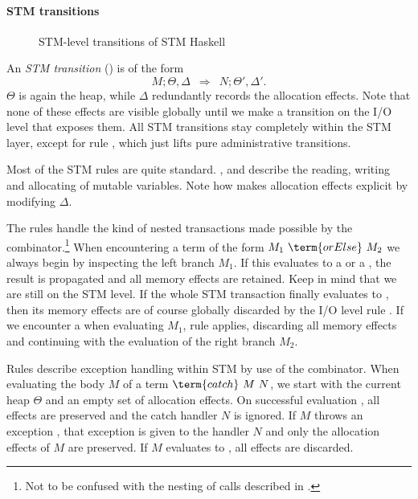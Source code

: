 \paragraph{STM transitions}

\begin{figure}

\caption{STM-level transitions of STM Haskell \parencite{harris-et-al-2005}}
\label{fig:orig-stm}
\end{figure}

An \emph{STM transition} () is of the form 
$$M;\Theta,\Delta \enspace\Rightarrow\enspace N;\Theta',\Delta'.$$
$\Theta$ is again the heap, while $\Delta$ redundantly records the allocation effects.
Note that none of these effects are visible globally until we make a transition on the I/O level that exposes them.
All STM transitions stay completely within the STM layer, except for rule , which just lifts pure administrative transitions.

Most of the STM rules are quite standard.
,  and  describe the reading, writing and allocating of mutable variables.
Note how  makes allocation effects explicit by modifying $\Delta$.

The rules  handle the kind of nested transactions made possible by the  combinator.\footnote{Not to be confused with the nesting of  calls described in .}
When encountering a term of the form $M_1\ \term{orElse}\ M_2$ we always begin by inspecting the left branch $M_1$.
If this evaluates to a   or a  , the result is propagated and all memory effects are retained.
Keep in mind that we are still on the STM level.
If the whole STM transaction finally evaluates to , then its memory effects are of course globally discarded by the I/O level rule .
If we encounter a  when evaluating $M_1$, rule  applies, discarding all memory effects and continuing with the evaluation of the right branch $M_2$.

Rules  describe exception handling within STM by use of the  combinator.
When evaluating the body $M$ of a term $\term{catch}\ M\ N$, we start with the current heap $\Theta$ and an empty set of allocation effects.
On successful evaluation , all effects are preserved and the catch handler $N$ is ignored.
If $M$ throws an exception , that exception is given to the handler $N$ and only the allocation effects of $M$ are preserved.
If $M$ evaluates to  , all effects are discarded.

